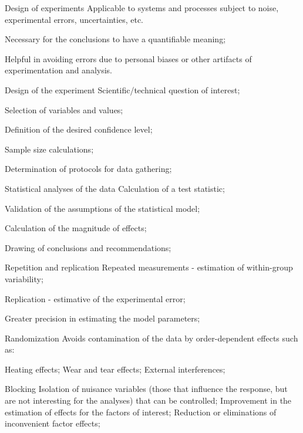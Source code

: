 \begin{frame}{Design of experiments}
\bitems Applicable to systems and processes subject to noise, experimental errors, uncertainties, etc.
	\item Necessary for the conclusions to have a quantifiable meaning;
	\item Helpful in avoiding errors due to personal biases or other artifacts of experimentation and analysis.
\eitem
\end{frame}

\begin{frame}{Design of the experiment}
	\bitems Scientific/technical question of interest;
		\item Selection of variables and values;
		\item Definition of the desired confidence level;
		\item Sample size calculations;
		\item Determination of protocols for data gathering;
	\eitem
\end{frame}

\begin{frame}{Statistical analyses of the data}
	\bitems Calculation of a test statistic;
		\item Validation of the assumptions of the statistical model;
		\item Calculation of the magnitude of effects;
		\item Drawing of conclusions and recommendations;
	\eitem
\end{frame}

\begin{frame}{Repetition and replication}
	\bitems Repeated measurements - estimation of within-group variability;
		\item Replication - estimative of the experimental error;
		\item Greater precision in estimating the model parameters;
	\eitem
\end{frame}

\begin{frame}{Randomization}
\bitems Avoids contamination of the data by order-dependent effects such as:

	\bitems Heating effects;
		\spitem Wear and tear effects;
		\spitem External interferences;
	\eitem
\eitem
\end{frame}

\begin{frame}{Blocking}
\bitems Isolation of nuisance variables (those that influence the response, but are not interesting for the analyses) that can be controlled;
	\spitem Improvement in the estimation of effects for the factors of interest;
	\spitem Reduction or eliminations of inconvenient factor effects;
\eitem
\end{frame}

